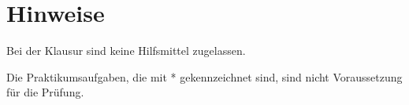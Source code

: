 





\maketitle
\newpage
\tableofcontents
\newpage


\section*{Hinweise}
Bei der Klausur sind keine Hilfsmittel zugelassen.

Die Praktikumsaufgaben, die mit * gekennzeichnet sind, sind nicht Voraussetzung für die Prüfung.

